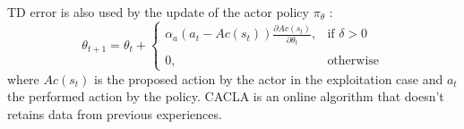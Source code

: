 TD error is also used by the update of the actor policy $\pi_\theta$ :
\begin{equation}
 \theta_{t+1} = \theta_t + 
 \begin{cases}
 \alpha_a (a_t - Ac(s_t))
 \frac{\partial Ac(s_t)}{\partial \theta_t} , & \text{if } \delta > 0\\ \\
 0, & \text{otherwise}
 \end{cases}
\end{equation}
where $Ac(s_t)$ is the proposed action by the actor in the exploitation case and $a_t$ the performed action
by the policy.
CACLA is an online algorithm that doesn't retains data from previous experiences. %





